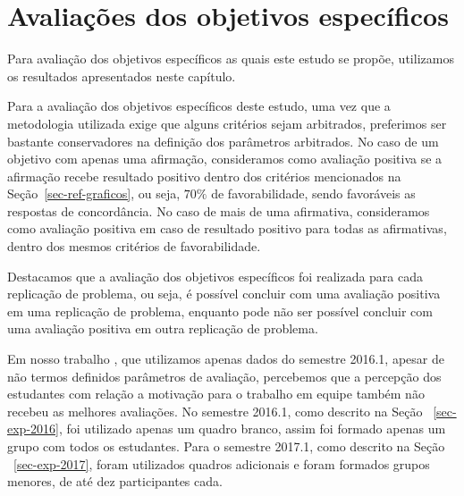 \section{Avaliações dos objetivos específicos}
\label{sec-avaliacao-hipoteses}
Para avaliação dos objetivos específicos as quais este estudo se propõe,
utilizamos os resultados apresentados neste capítulo.

Para a avaliação dos objetivos específicos deste estudo, uma vez que a
metodologia utilizada exige que alguns critérios sejam
arbitrados, preferimos ser bastante conservadores
na definição dos parâmetros arbitrados.
No caso de um objetivo com apenas uma afirmação, consideramos
como avaliação positiva se a afirmação recebe
resultado positivo dentro dos critérios mencionados na
Seção~\ref{sec-ref-graficos}, ou seja, $70\%$ de favorabilidade,
sendo favoráveis as respostas de concordância.
No caso de mais de uma afirmativa, consideramos
como avaliação positiva em caso de resultado positivo para todas
as afirmativas, dentro dos mesmos critérios de favorabilidade.

Destacamos que a avaliação dos objetivos específicos foi realizada para
cada replicação de problema, ou seja, é possível concluir com
uma avaliação positiva em uma replicação de problema, enquanto pode
não ser possível concluir com uma avaliação positiva em outra replicação
de problema.


\AprovacaoObjetivoResultado{}{}{}{}{}{}{}{}{}


Em nosso trabalho \cite{gavaza2017}, que utilizamos apenas dados do
semestre 2016.1, apesar de não termos definidos parâmetros
de avaliação, percebemos que a percepção dos estudantes com relação
a motivação para o trabalho em equipe também não recebeu as melhores
avaliações.
No semestre 2016.1, como descrito na Seção ~\ref{sec-exp-2016}, foi utilizado
apenas um quadro branco, assim foi formado apenas um grupo com todos
os estudantes.
Para o semestre 2017.1, como descrito na Seção ~\ref{sec-exp-2017}, foram
utilizados quadros adicionais e foram formados grupos menores,
de até dez participantes cada.

